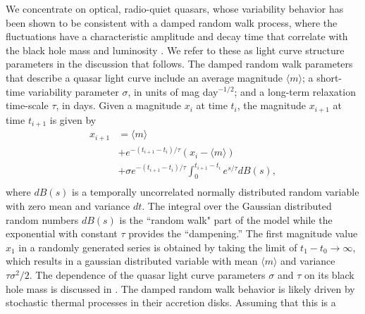 \documentclass{emulateapj}
\begin{document}
We concentrate on optical, radio-quiet quasars, whose variability
behavior has been shown to be consistent with a damped random walk
process, where the fluctuations have a characteristic amplitude and
decay time that correlate with the black hole mass and luminosity
\citep{MacLeod2010a, Kelly2009a}.  We refer to these as light curve
structure parameters in the discussion that follows.  The damped
random walk parameters that describe a quasar light curve include an
average magnitude $\langle m \rangle$; a short-time variability
parameter $\sigma$, in units of mag day$^{-1/2}$; and a long-term
relaxation time-scale $\tau$, in days. Given a magnitude $x_i$ at time
$t_i$, the magnitude $x_{i+1}$ at time $t_{i+1}$ is given by
\begin{equation}
\begin{split}
x_{i+1}&  =  \langle m \rangle  \\
&+ e^{-(t_{i+1}-t_i)/\tau}\left(x_{i}-\langle m \rangle\right)\\
&+ \sigma e^{-(t_{i+1}-t_i)/\tau}\int_{0}^{t_{i+1}-t_{i}}e^{s/\tau}dB(s),\\
\end{split}
\label{eq:generative}
\end{equation} 
where $dB(s)$ is a temporally uncorrelated normally distributed random
variable with zero mean and variance $dt$. The integral over the
Gaussian distributed random numbers $dB(s)$ is the ``random walk" part
of the model while the exponential with constant $\tau$ provides the
``dampening.''  The first magnitude value $x_1$ in a randomly
generated series is obtained by taking the limit of
$t_1-t_0\to\infty$, which results in a gaussian distributed variable
with mean $\langle m \rangle$ and variance $\tau\sigma^2/2$.  The
dependence of the quasar light curve parameters $\sigma$ and $\tau$ on
its black hole mass is discussed in \citet{Kelly2009a}.
The damped random walk behavior is likely driven by stochastic thermal
processes in their accretion disks.  Assuming that this is a
\end{document}
